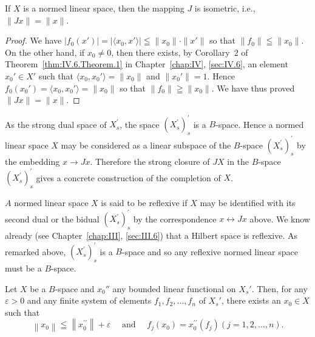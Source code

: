 \begin{theorem}\label{thm:IV.8.Theorem.2} If $X$ is a normed linear space, then the mapping $J$ is isometric, i.e., $\|Jx\| = \|x\|$. 
\end{theorem}

\begin{proof}
 We have $|f_0(x')| = |\langle x_0, x' \rangle| \leqq \|x_0\| \cdot \|x'\|$ so that $\|f_0\| \leqq \|x_0\|$. On the other hand, if $x_0 \neq 0$, then there exists, by Corollary~\hyperref[cor:IV.6.Corollary.2]{$2$} of Theorem~\ref{thm:IV.6.Theorem.1} in Chapter~\ref{chap:IV}, \ref{sec:IV.6}, an element $x_0' \in X'$ such that $\langle x_0, x_0' \rangle = \|x_0\|$ and $\|x_0'\| = 1$. Hence $f_0(x_0') = \langle x_0, x_0' \rangle = \|x_0\|$ so that $\|f_0\| \geqq \|x_0\|$. We have thus proved $\|Jx\| = \|x\|$. 
\end{proof}

\begin{remarku} As the strong dual space of $X_{s}^{\prime}$, the space $(X_{s}^{\prime})_{s}^{\prime}$ is a $B$-space. Hence a normed linear space $X$ may be considered as a linear subspace of the $B$-space $(X_{s}^{\prime})_{s}^{\prime}$ by the embedding $x \to Jx$. Therefore the strong closure of $JX$ in the $B$-space $(X_{s}^{\prime})_{s}^{\prime}$ gives a concrete construction of the completion of $X$. 
\end{remarku}

\begin{definition}\label{def:IV.8.Definition.4} $A$ normed linear space $X$ is said to be reflexive if $X$ may be identified with its second dual or the bidual $(X_{s}^{\prime})_{s}^{\prime}$ by the correspondence $x \leftrightarrow Jx$ above. We know already (see Chapter~\ref{chap:III}, \ref{sec:III.6}) that a Hilbert space is reflexive. As remarked above, $(X_{s}^{\prime})_{s}^{\prime}$ is a $B$-space and so any reflexive normed linear space must be a $B$-space. 
\end{definition}

\begin{theorem}\label{thm:IV.8.Theorem.3} Let $X$ be a $B$-space and $x_0''$ any bounded linear functional on $X_s'$. Then, for any $\varepsilon > 0$ and any finite system of elements $f_1, f_2, \ldots, f_n$ of $X_s'$, there exists an $x_0 \in X$ such that 
\[
\left\| x _{0} \right\| \leqq \left\| x _{0} ^{\prime \prime} \right\| + \varepsilon \quad \text{ and } \quad f _{j} (x _{0}) = x _{0} ^{\prime \prime} (f _{j}) (j = 1, 2, \dots , n).
\]
\end{theorem}

